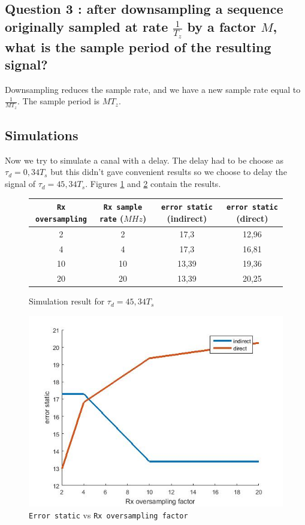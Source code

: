 \documentclass{article}
\begin{document}
    \subsection{Question 3 : after downsampling a sequence originally sampled at rate $\frac{1}{T_z}$ by a factor $M$, what is the sample period of the resulting signal?}
    Downsampling reduces the sample rate, and we have a new sample rate equal to $\frac{1}{MT_z}$. The sample period is $MT_z$.
    
    
    \subsection{Simulations}
        Now we try to simulate a canal with a delay. The delay had to be choose as $\tau_d = 0,34T_s$ but this didn't gave convenient results so we choose to delay the signal of $\tau_d = 45,34T_s$. Figures \ref{sim} and \ref{plot} contain the results.
\begin{figure}[h]
\centering
\begin{tabular}{|c|c|c|c|}
        \hline
        \texttt{Rx oversampling} & \texttt{Rx sample rate} ($MHz$) & \texttt{error static} (indirect) & \texttt{error static} (direct) \\
        \hline 
        2 & 2 &  17,3& 12,96 \\
        \hline
        4 & 4 &  17,3& 16,81 \\
        \hline
        10 & 10 &  13,39 & 19,36 \\
        \hline
        20 & 20 & 13,39 & 20,25 \\
        \hline
\end{tabular}
\caption{Simulation result for $\tau_d = 45,34T_s$ \label{sim}}
\end{figure}

\begin{figure}[h]
\centering
\includegraphics[width = 0.7 \textwidth]{result.jpg}
\caption{\texttt{Error static} vs \texttt{Rx oversampling factor}}
\label{plot}
\end{figure}
\end{document}
